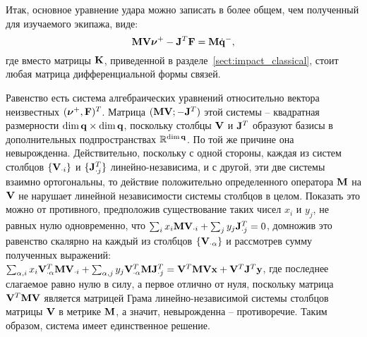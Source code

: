Итак, основное уравнение удара можно записать в более общем, чем полученный для изучаемого экипажа, виде:
\begin{equation}\label{eq:udar_mat_Jt}
    \mathbf{M}\mathbf{V}\boldsymbol{\mathbf{\nu}}^+ - \mathbf{\mathbf{J}}^T\mathbf{F} = \mathbf{M}\dot{\mathbf{q}}^-,
\end{equation}
где вместо матрицы $\mathbf{K}$, приведенной в разделе~\ref{sect:impact_classical}, стоит любая матрица дифференциальной формы связей.

Равенство есть система алгебраических уравнений относительно вектора неизвестных $(\boldsymbol{\mathbf{\nu}}^+, \mathbf{F})^T$. Матрица $(\mathbf{M}\mathbf{V}; -\mathbf{J}^T)$ этой системы -- квадратная размерности $\dim \mathbf{q} \times \dim \mathbf{q}$, поскольку столбцы $\mathbf{V}$ и $\mathbf{J}^T$ образуют базисы в дополнительных подпространствах $\mathbb{R}^{\dim \mathbf{q}}$. По той же причине она невырожденна. Действительно, поскольку с одной стороны, каждая из систем столбцов $\{\mathbf{V}_{\cdot i}\}$ и $\{\mathbf{J}^T_{\cdot j}\}$ линейно-независима, и с другой, эти две системы взаимно ортогональны, то действие положительно определенного оператора $\mathbf{M}$ на $\mathbf{V}$ не нарушает линейной независимости системы столбцов в целом. Показать это можно от противного, предположив существование таких чисел $x_i$ и $y_j$, не равных нулю одновременно, что $\sum_i x_i \mathbf{M} \mathbf{V}_{\cdot i} + \sum_j y_j \mathbf{J}^T_{\cdot j} = 0$, домножив это равенство скалярно на каждый из столбцов $\{\mathbf{V}_{\cdot \alpha}\}$ и рассмотрев сумму полученных выражений: $\sum_{\alpha, i} x_i \mathbf{V}_{\cdot \alpha}^T \mathbf{M} \mathbf{V}_{\cdot i} + \sum_{\alpha, j} y_j \mathbf{V}_{\cdot \alpha}^T \mathbf{M} \mathbf{J}^T_{\cdot j} = \mathbf{V}^T \mathbf{M} \mathbf{V} \mathbf{x} + \mathbf{V}^T\mathbf{J}^T\mathbf{y}$, где последнее слагаемое равно нулю в силу, а первое отлично от нуля, поскольку матрица $\mathbf{V}^T \mathbf{M} \mathbf{V}$ является матрицей Грама линейно-независимой системы столбцов матрицы $\mathbf{V}$ в метрике $\mathbf{M}$, а значит, невырожденна -- противоречие. Таким образом, система имеет единственное решение.

